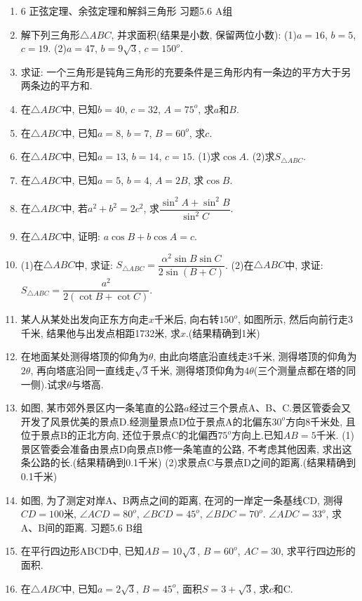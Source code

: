 \documentclass[10pt,a4paper]{article}
\begin{document}
\begin{enumerate}[1.]
\item 6  正弦定理、余弦定理和解斜三角形
习题5.6  A组
\item 解下列三角形$\triangle ABC$, 并求面积(结果是小数, 保留两位小数):
(1)$a=16$, $b=5$, $c=19$.
(2)$a=47$, $b=9\sqrt 3$, $c=150^o$.
\item 求证: 一个三角形是钝角三角形的充要条件是三角形内有一条边的平方大于另两条边的平方和.
\item 在$\triangle ABC$中, 已知$b=40$, $c=32$, $A=75^o$, 求$a$和$B$.
\item 在$\triangle ABC$中, 已知$a=8$, $b=7$, $B=60^o$, 求$c$.
\item 在$\triangle ABC$中, 已知$a=13$, $b=14$, $c=15$.
(1)求$\cos A$.
(2)求$S_{\triangle ABC}$.
\item 在$\triangle ABC$中, 已知$a=5$, $b=4$, $A=2B$, 求$\cos B$.
\item 在$\triangle ABC$中, 若$a^2+b^2=2c^2$, 求$\dfrac{{{\sin }^2}A+{{\sin }^2}B}{{{\sin }^2}C}$.
\item 在$\triangle ABC$中, 证明: $a\cos B+b\cos A=c$.
\item (1)在$\triangle ABC$中, 求证: $S_{\triangle ABC}=\dfrac{{{\alpha }^2}\sin B\sin C}{2\sin (B+C)}$.
(2)在$\triangle ABC$中, 求证: $S_{\triangle ABC}=\dfrac{a^2}{2(\cot B+\cot C)}$.
\item 某人从某处出发向正东方向走$x$千米后, 向右转$150^o$, 如图所示, 然后向前行走3千米, 结果他与出发点相距1732米, 求$x$.(结果精确到1米)
\item 在地面某处测得塔顶的仰角为$\theta$, 由此向塔底沿直线走3千米, 测得塔顶的仰角为$2\theta$, 再向塔底沿同一直线走$\sqrt 3$千米, 测得塔顶仰角为$4\theta$(三个测量点都在塔的同一侧).试求$\theta$与塔高.
\item 如图, 某市郊外景区内一条笔直的公路$a$经过三个景点A、B、C.景区管委会又开发了风景优美的景点D.经测量景点D位于景点A的北偏东$30^o$方向8千米处, 且位于景点B的正北方向, 还位于景点C的北偏西$75^o$方向上.已知$AB=5$千米.
(1)景区管委会准备由景点D向景点B修一条笔直的公路, 不考虑其他因素, 求出这条公路的长.(结果精确到0.1千米)
(2)求景点C与景点D之间的距离.(结果精确到0.1千米)
\item 如图, 为了测定对岸A、B两点之间的距离, 在河的一岸定一条基线CD, 测得$CD=100$米, $\angle ACD=80^o$, $\angle BCD=45^o$, $\angle BDC=70^o$. $\angle ADC=33^o$, 求A、B间的距离.
习题5.6  B组
\item 在平行四边形ABCD中, 已知$AB=10\sqrt 3$, $B=60^o$, $AC=30$, 求平行四边形的面积.
\item 在$\triangle ABC$中, 已知$a=2\sqrt 3$, $B=45^o$, 面积$S=3+\sqrt 3$, 求$c$和C.

\end{enumerate}
\end{document}
